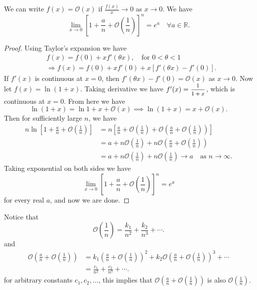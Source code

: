 \begin{lemma}
    We can write $f(x) = \mathcal{O}(x)$ if $\frac{f(x)}{x} \to 0$ as $x \to 0$. We have 
    \begin{equation}
        \lim_{x \to 0} \left[ 1 + \frac{a}{n} + \mathcal{O}\left(\frac{1}{n} \right)\right]^n = e^a \quad \forall a \in \mathbb{R}.
    \end{equation}
\end{lemma}
\begin{proof}
    Using Taylor's expansion we have
    \begin{align*}
        &f(x) = f(0) + x f'(\theta x), \quad \text{for }0 < \theta < 1\\
        &\Rightarrow f(x) = f(0) + xf'(0) + x [f'(\theta x) - f'(0)].
    \end{align*}
    If $f'(x)$ is continuous at $x=0$, then $f'(\theta x) - f'(0) = \mathcal{O}(x)$ as $x \to 0$. Now let 
    $f(x) = \ln (1 + x)$. Taking derivative we have $f'(x) = \mfrac{1}{1+x}$, which is continuous at $x=0$. From here we have
    \[
        \ln (1 + x) = \ln 1 + x + \mathcal{O}(x) \implies \ln (1 + x) = x + \mathcal{O}(x).
    \]
    Then for sufficiently large $n$, we have
    \begin{align*}
        n \ln \left[ 1 + \frac{a}{n} + \mathcal{O}\left(\frac{1}{n} \right)\right] 
        &= n \left[ \frac{a}{n} + \mathcal{O}\left(\frac{1}{n} \right) + \mathcal{O}\left( \frac{a}{n} + \mathcal{O}\left(\frac{1}{n} \right) \right)\right]\\
        &= a + n \mathcal{O}\left(\frac{1}{n} \right) + n \mathcal{O}\left( \frac{a}{n} + \mathcal{O}\left(\frac{1}{n} \right) \right)\\
        &= a + n \mathcal{O}\left(\frac{1}{n} \right) + n \mathcal{O}\left(\frac{1}{n} \right)
        \to a \quad \text{as } n \to \infty.
    \end{align*}
    Taking exponential on both sides we have
    \[
        \lim_{x \to 0} \left[ 1 + \frac{a}{n} + \mathcal{O}\left(\frac{1}{n} \right)\right]^n = e^a
    \]
    for every real $a$, and now we are done.
\end{proof}
\begin{remark}
    Notice that 
    \[
        \mathcal{O} \left( \frac{1}{n}\right) = \frac{k_1}{n^2} + \frac{k_2}{n^3} + \cdots.
    \]
    and 
    \begin{align*}
        \mathcal{O}\left( \frac{a}{n} + \mathcal{O}\left(\frac{1}{n} \right) \right) &= k_1 \left( \frac{a}{n} + \mathcal{O}\left(\frac{1}{n} \right) \right)^2 + 
        k_2 \mathcal{O}\left( \frac{a}{n} + \mathcal{O}\left(\frac{1}{n} \right) \right)^3 + \cdots\\
        &= \frac{c_1}{n^2} + \frac{c_2}{n^3} + \cdots.
    \end{align*}
    for arbitrary constants $c_1, c_2, \ldots$, this implies that $\mathcal{O}\left( \frac{a}{n} + \mathcal{O}\left(\frac{1}{n} \right) \right)$ 
    is also $\mathcal{O}\left( \frac{1}{n} \right)$.
\end{remark}

